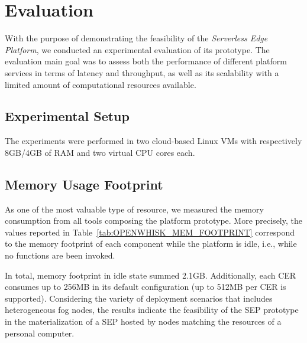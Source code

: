 \section{Evaluation}\label{sec:evaluation}

With the purpose of demonstrating the feasibility of the \textit{Serverless Edge Platform}, we conducted an experimental evaluation of its prototype. The evaluation main goal was to assess both the performance of different platform services in terms of latency and throughput, as well as its scalability with a limited amount of computational resources available. 

\subsection{Experimental Setup}

The experiments were performed in two cloud-based Linux VMs with respectively 8GB/4GB of RAM and two virtual CPU cores each.

\subsection{Memory Usage Footprint}

As one of the most valuable type of resource, we measured the memory consumption from all tools composing the platform prototype. More precisely, the values reported in Table~\ref{tab:OPENWHISK_MEM_FOOTPRINT} correspond to the memory footprint of each component while the platform is idle, i.e., while no functions are been invoked.

In total, memory footprint in idle state summed  2.1GB. Additionally, each CER consumes up to 256MB in its default configuration (up to 512MB per CER is supported). Considering the variety of deployment scenarios that includes heterogeneous fog nodes, the results indicate the feasibility of the SEP prototype in the materialization of a SEP hosted by nodes matching the resources of a personal computer. 


